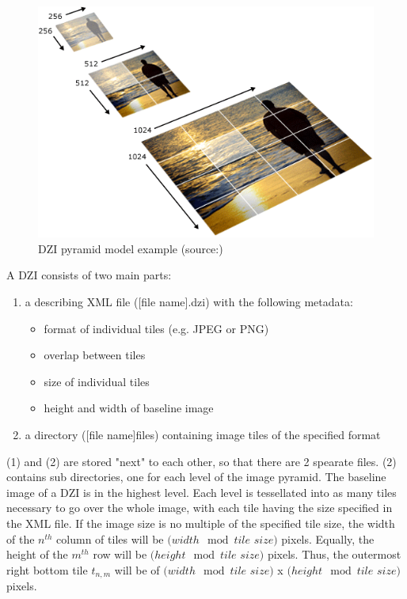 \begin{figure}[H]
	\begin{center}
		\includegraphics[scale=0.4]{img/dzi_pyramid.png}
		\caption{DZI pyramid model example (source:\cite{web:dzi})}
		\label{fig2_dziModel}
	\end{center}
\end{figure}

A DZI consists of two main parts\cite{web:dzi}: 
\begin{enumerate}[(1)]
	\item a describing XML file ([file name].dzi) with the following metadata:
	\begin{itemize}
		\item format of individual tiles (e.g. JPEG or PNG)
		\item overlap between tiles
		\item size of individual tiles
		\item height and width of baseline image
	\end{itemize}
	\item a directory ([file name]{\textunderscore}files) containing image tiles of the specified format
\end{enumerate}

(1) and (2) are stored "next" to each other, so that there are 2 spearate files. (2) contains sub directories, one for each level of the image pyramid. The baseline image of a DZI is in the highest level. Each level is tessellated into as many tiles necessary to go over the whole image, with each tile having the size specified in the XML file. If the image size is no multiple of the specified tile size, the width of the $n^{th}$ column of tiles will be $(width \mod tile$ $size)$ pixels. Equally, the height of the $m^{th}$ row will be $(height \mod tile$ $size)$ pixels. Thus, the outermost right bottom tile $t_{n,m}$ will be of $(width \mod tile$ $size)$ x $(height \mod tile$ $size)$ pixels.


